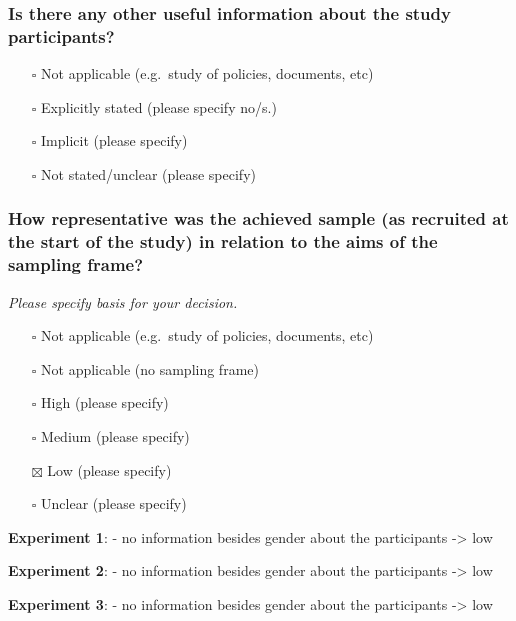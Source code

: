 \documentclass[
  doc, a4paper]{apa7}
\providecommand{\tightlist}{%
  \setlength{\itemsep}{0pt}\setlength{\parskip}{0pt}}
\begin{document}
\subsubsection{Is there any other useful information about the study participants?}\label{is-there-any-other-useful-information-about-the-study-participants}

\begin{itemize}
\tightlist
\item[$\square$]
  Not applicable (e.g.~study of policies, documents, etc)
\item[$\square$]
  Explicitly stated (please specify no/s.)
\item[$\square$]
  Implicit (please specify)
\item[$\square$]
  Not stated/unclear (please specify)
\end{itemize}

\subsubsection{How representative was the achieved sample (as recruited at the start of the study) in relation to the aims of the sampling frame?}\label{how-representative-was-the-achieved-sample-as-recruited-at-the-start-of-the-study-in-relation-to-the-aims-of-the-sampling-frame}

\emph{Please specify basis for your decision.}

\begin{itemize}
\tightlist
\item[$\square$]
  Not applicable (e.g.~study of policies, documents, etc)
\item[$\square$]
  Not applicable (no sampling frame)
\item[$\square$]
  High (please specify)
\item[$\square$]
  Medium (please specify)
\item[$\boxtimes$]
  Low (please specify)
\item[$\square$]
  Unclear (please specify)
\end{itemize}

\textbf{Experiment 1}:
- no information besides gender about the participants -\textgreater{} low

\textbf{Experiment 2}:
- no information besides gender about the participants -\textgreater{} low

\textbf{Experiment 3}:
- no information besides gender about the participants -\textgreater{} low
\end{document}
